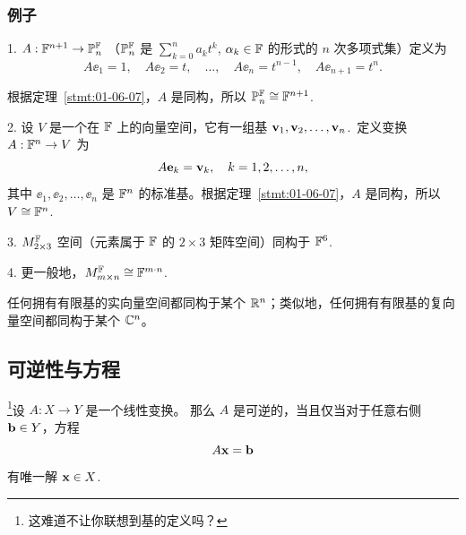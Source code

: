 \subsubsection{例子}\label{sec:01-06-03-01}

1. $A: \mathbb{F}^{n+1} \to \mathbb{P}^{\mathbb{F}}_n$ （$\mathbb{P}^{\mathbb{F}}_n$ 是 $\sum_{k=0}^n a_k t^k$, $\alpha_k \in \mathbb{F}$ 的形式的 $n$ 次多项式集）定义为
$$A \ee_1 = 1,\quad A \ee_2 = t,\quad \dots,\quad A \ee_n = t^{n-1},\quad A \ee_{n+1} = t^n.$$

根据定理~\ref{stmt:01-06-07}，$A$ 是同构，所以 $\mathbb{P}^{\mathbb{F}}_n \cong \mathbb{F}^{n+1}$.~

2. 设 $V$ 是一个在 $\mathbb{F}$ 上的向量空间，它有一组基 $\mathbf{v}_1, \mathbf{v}_2, \dots, \mathbf{v}_n$.~定义变换 $A: \mathbb{F}^n \to V$ 为
$$A \mathbf{e}_k = \mathbf{v}_k,\quad k = 1, 2, \dots, n,$$
其中 $\ee_1, \ee_2, \dots, \ee_n$ 是 $\mathbb{F}^n$ 的标准基。根据定理~\ref{stmt:01-06-07}，$A$ 是同构，所以 $V \cong \mathbb{F}^n$.~

3. $M^{\mathbb{F}}_{2 \times 3}$ 空间（元素属于 $\mathbb{F}$ 的 $2 \times 3$ 矩阵空间）同构于 $\mathbb{F}^6$.~

4. 更一般地，$M^{\mathbb{F}}_{m \times n} \cong \mathbb{F}^{m \cdot n}$.~

\begin{remark*}
任何拥有有限基的实向量空间都同构于某个 $\mathbb{R}^n$；类似地，任何拥有有限基的复向量空间都同构于某个 $\mathbb{C}^n$。
\end{remark*}

\subsection{可逆性与方程}\label{sec:01-06-04}

\begin{theorem}\label{stmt:01-06-08} \footnote{
这难道不让你联想到基的定义吗？
}设 $A: X \to Y$ 是一个线性变换。
那么 $A$ 是可逆的，当且仅当对于任意右侧 $\mathbf{b} \in Y$，方程 $$A \mathbf{x} = \mathbf{b}$$ 有唯一解 $\mathbf{x} \in X$.~\end{theorem}

